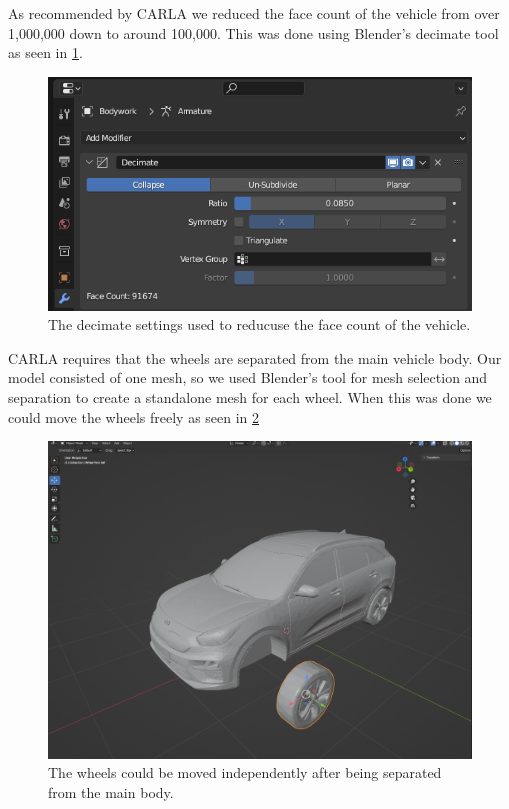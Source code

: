 As recommended by CARLA we reduced the face count of the vehicle from over 1,000,000 down to around 100,000. This was done using Blender's decimate tool as seen in \cref{fig:blender-decimate}. 

\begin{figure}[h!]
    \centering
    \includegraphics[width=.8\textwidth]{chapters/3-method/figures/blender-kia-decimate.png}
    \caption{The decimate settings used to reducuse the face count of the vehicle.}
    \label{fig:blender-decimate}
\end{figure}

CARLA requires that the wheels are separated from the main vehicle body. Our model consisted of one mesh, so we used Blender's tool for mesh selection and separation to create a standalone mesh for each wheel. When this was done we could move the wheels freely as seen in \cref{fig:blender-wheel}

\begin{figure}[h!]
    \centering
    \includegraphics[width=.8\textwidth]{chapters/3-method/figures/blender-kia-wheel.png}
    \caption{The wheels could be moved independently after being separated from the main body.}
    \label{fig:blender-wheel}
\end{figure}

